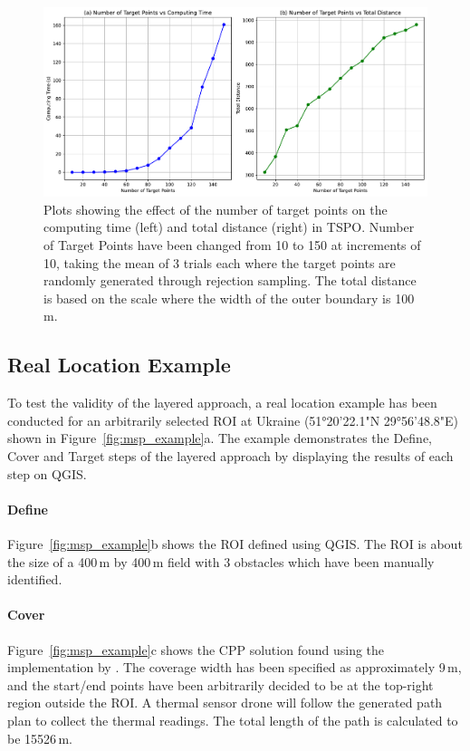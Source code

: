 \begin{figure}[h!]
    \centering
    \includegraphics[width=\linewidth]{figs/Jihwan/target_points_vs.pdf}
    \caption[Effect of Number of Target Points on Computing Time and Total Distance of TSP-O Solution]
    {Plots showing the effect of the number of target points on the computing time (left) and total distance (right) in \gls{TSPO}. Number of Target Points have been changed from 10 to 150 at increments of 10, taking the mean of 3 trials each where the target points are randomly generated through rejection sampling. The total distance is based on the scale where the width of the outer boundary is 100\,m.}
    \label{fig:msp_tspo_plot}
\end{figure}

\subsection{Real Location Example}
\label{sec:msp_example}

To test the validity of the layered approach, a real location example has been conducted for an arbitrarily selected \gls{ROI} at Ukraine (51°20'22.1"N 29°56'48.8"E) shown in Figure~\ref{fig:msp_example}a. The example demonstrates the Define, Cover and Target steps of the layered approach by displaying the results of each step on \gls{QGIS}. 

\paragraph{Define} Figure~\ref{fig:msp_example}b shows the \gls{ROI} defined using \gls{QGIS}. The \gls{ROI} is about the size of a 400\,m by 400\,m field with 3 obstacles which have been manually identified.  

\paragraph{Cover} Figure~\ref{fig:msp_example}c shows the \gls{CPP} solution found using the implementation by \cite{bahnemann2021cpp}. The coverage width has been specified as approximately 9\,m, and the start/end points have been arbitrarily decided to be at the top-right region outside the \gls{ROI}. A thermal sensor drone will follow the generated path plan to collect the thermal readings. The total length of the path is calculated to be 15526\,m.


